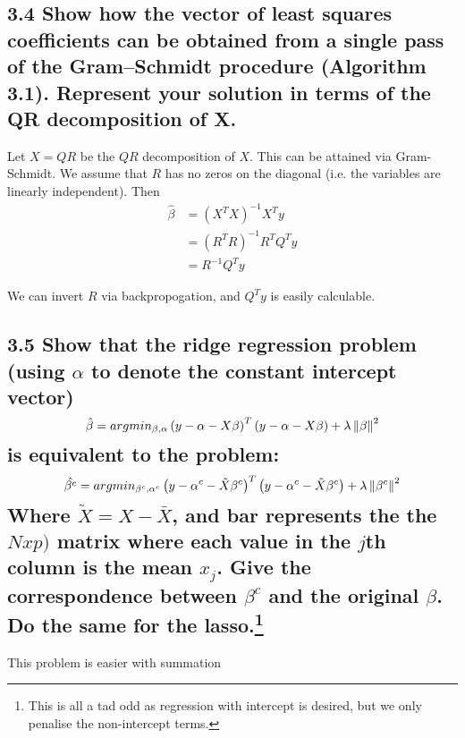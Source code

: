 \subsection*{ 3.4 Show how the vector of least squares coefficients can be obtained
from a single pass of the Gram–Schmidt procedure (Algorithm 3.1). Represent your solution in terms of the QR decomposition of X.}

Let $X = QR$ be the $QR$ decomposition of $X$. This can be attained via Gram-Schmidt. We assume that $R$ has no zeros on the diagonal (i.e. the variables are linearly independent).
Then 
\begin{align*}
    \hat{\beta} &= (X^T X)^{-1} X^T y \\
    &= (R^T R)^{-1} R^T Q^T y \\
    &= R^{-1} Q^T y
\end{align*}

We can invert $R$ via backpropogation, and $Q^T y$ is easily calculable.






\subsection*{3.5 Show that the ridge regression problem (using $\alpha$ to denote the constant intercept vector)
$$\hat{\beta} = argmin_{\beta,\alpha} \left(y - \alpha - X \beta\right)^T\left(y - \alpha - X \beta\right) + \lambda \left\lVert\beta\right\rVert^2 $$
is equivalent to the problem:
$$\hat{\beta^c} = argmin_{\beta^c, \alpha^c} \left(y - \alpha^c - \tilde{X} \beta^c\right)^T\left(y - \alpha^c - \tilde{X} \beta^c\right) + \lambda \left\lVert\beta^c\right\rVert^2 $$
Where $\tilde{X} = X - \bar{X}$, and bar represents the the $N x p)$ matrix where each value in the $j$th column is the mean $x_j$. Give the correspondence between $\beta^c$ and the original $\beta$. Do the same for the lasso.\footnote{
This is all a tad odd as regression with intercept is desired, but we only penalise the non-intercept terms.}}

This problem is easier with summation

